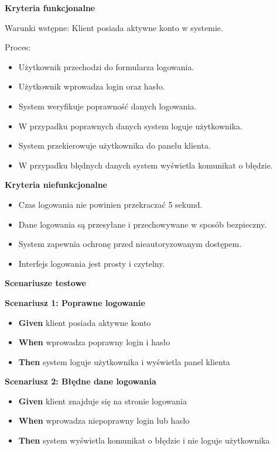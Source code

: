 \documentclass[a4paper,12pt]{article}
\begin{document}
\noindent \textbf{Kryteria funkcjonalne}

\vspace{0,2cm}

\noindent Warunki wstępne: Klient posiada aktywne konto w systemie.

\vspace{0,2cm}

\noindent Proces:

\begin{itemize}
    \item Użytkownik przechodzi do formularza logowania.
    \item Użytkownik wprowadza login oraz hasło.
    \item System weryfikuje poprawność danych logowania.
    \item W przypadku poprawnych danych system loguje użytkownika.
    \item System przekierowuje użytkownika do panelu klienta.
    \item W przypadku błędnych danych system wyświetla komunikat o błędzie.
\end{itemize}

\noindent \textbf{Kryteria niefunkcjonalne}
\begin{itemize}
    \item Czas logowania nie powinien przekraczać 5 sekund.
    \item Dane logowania są przesyłane i przechowywane w sposób bezpieczny.
    \item System zapewnia ochronę przed nieautoryzowanym dostępem.
    \item Interfejs logowania jest prosty i czytelny.
\end{itemize}

\noindent \textbf{Scenariusze testowe}

\textbf{Scenariusz 1: Poprawne logowanie}
\begin{itemize}
    \item \textbf{Given} klient posiada aktywne konto
    \item \textbf{When} wprowadza poprawny login i hasło
    \item \textbf{Then} system loguje użytkownika i wyświetla panel klienta
\end{itemize}

\textbf{Scenariusz 2: Błędne dane logowania}
\begin{itemize}
    \item \textbf{Given} klient znajduje się na stronie logowania
    \item \textbf{When} wprowadza niepoprawny login lub hasło
    \item \textbf{Then} system wyświetla komunikat o błędzie i nie loguje użytkownika
\end{itemize}
\end{document}
